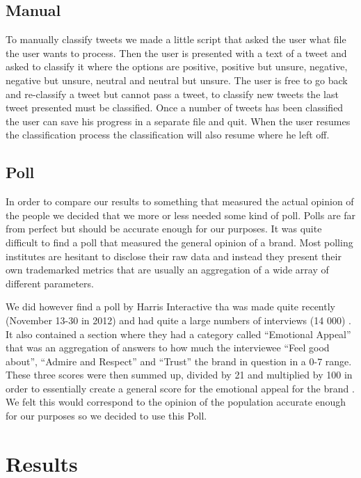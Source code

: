 \documentclass[a4paper,12pt]{report}
\begin{document}
\section{Manual}

To manually classify tweets we made a little script that asked the user what file the user wants to process. 
Then the user is presented with a text of a tweet and asked to classify it where the options are positive, positive but unsure, negative, negative but unsure, neutral and neutral but unsure. 
The user is free to go back and re-classify a tweet but cannot pass a tweet, to classify new tweets the last tweet presented must be classified. 
Once a number of tweets has been classified the user can save his progress in a separate file and quit. 
When the user resumes the classification process the classification will also resume where he left off.

\section{Poll}

In order to compare our results to something that measured the actual opinion of the people we decided that we more or less needed some kind of poll. 
Polls are far from perfect but should be accurate enough for our purposes. It was quite difficult to find a poll that measured the general opinion of a brand. 
Most polling institutes are hesitant to disclose their raw data and instead they present their own trademarked metrics that are usually an aggregation of a wide array of different parameters.

We did however find a poll by Harris Interactive tha was made quite recently (November 13-30 in 2012) and had quite a large numbers of interviews (14 000) \cite{Harris13}. 
It also contained a section where they had a category called “Emotional Appeal” that was an aggregation of answers to how much the interviewee “Feel good about”, “Admire and Respect” and “Trust” the brand in question in a 0-7 range. 
These three scores were then summed up, divided by 21 and multiplied by 100 in order to essentially create a general score for the emotional appeal for the brand \cite{Harris13}. 
We felt this would correspond to the opinion of the population accurate enough for our purposes so we decided to use this Poll.

\chapter{Results}
\end{document}
